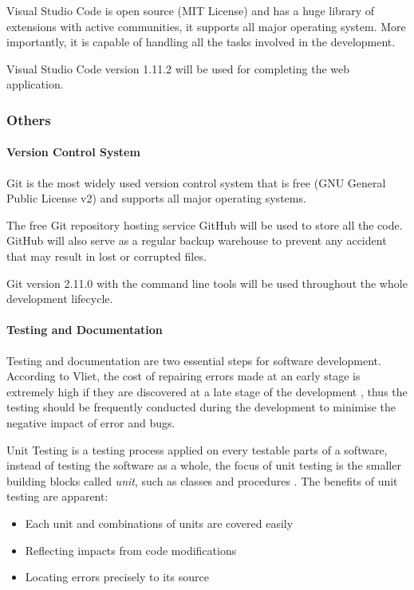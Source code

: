 \documentclass[doc,natbib]{apa6}
\begin{document}
Visual Studio Code is open source (MIT License) and has a huge library of extensions with active communities, it supports all major operating system. More importantly, it is capable of handling all the tasks involved in the development.

Visual Studio Code version 1.11.2 will be used for completing the web application.

\subsubsection{Others}\hfil\newline
\paragraph{Version Control System}\hfil\newline
Git is the most widely used version control system that is free (GNU General Public License v2) and supports all major operating systems. 

The free Git repository hosting service GitHub will be used to store all the code. GitHub will also serve as a regular backup warehouse to prevent any accident that may result in lost or corrupted files.

Git version 2.11.0 with the command line tools will be used throughout the whole development lifecycle.

\paragraph{Testing and Documentation}\hfil\newline
Testing and documentation are two essential steps for software development. According to Vliet, the cost of repairing errors made at an early stage is extremely high if they are discovered at a late stage of the development \citep[p. 386]{Vliet2007}, thus the testing should be frequently conducted during the development to minimise the negative impact of error and bugs.

Unit Testing is a testing process applied on every testable parts of a software, instead of testing the software as a whole, the focus of unit testing is the smaller building blocks called \textit{unit}, such as classes and procedures \citep[p. 85]{Myers2004a}. The benefits of unit testing are apparent:
\begin{itemize}
	\item Each unit and combinations of units are covered easily
	\item Reflecting impacts from code modifications
	\item Locating errors precisely to its source
\end{itemize}
\end{document}
